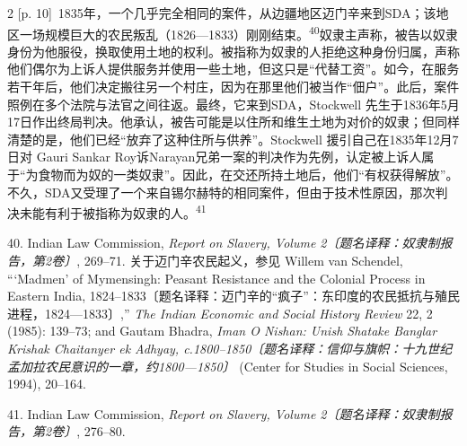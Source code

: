 \documentclass[10pt,a4paper]{article}
\begin{document}
\begin{paracol}{2}
{\scriptsize\color{gray} [p. 10]}\ 1835年，一个几乎完全相同的案件，从边疆地区迈门辛来到SDA；该地区一场规模巨大的农民叛乱（1826—1833）刚刚结\mbox{束。\textsuperscript{40}}奴隶主声称，被告以奴隶身份为他服役，换取使用土地的权利。被指称为奴隶的人拒绝这种身份归属，声称他们偶尔为上诉人提供服务并使用一些土地，但这只是“代替工资”。如今，在服务若干年后，他们决定搬往另一个村庄，因为在那里他们被当作“佃户”。此后，案件照例在多个法院与法官之间往返。最终，它来到SDA，Stockwell 先生于1836年5月17日作出终局判决。他承认，被告可能是以住所和维生土地为对价的奴隶；但同样清楚的是，他们已经“放弃了这种住所与供养”。Stockwell 援引自己在1835年12月7日对 Gauri Sankar Roy诉Narayan兄弟一案的判决作为先例，认定被上诉人属于“为食物而为奴的一类奴隶”。因此，在交还所持土地后，他们“有权获得解放”。不久，SDA又受理了一个来自锡尔赫特的相同案件，但由于技术性原因，那次判决未能有利于被指称为奴隶的\mbox{人。\textsuperscript{41}}\par{\small 40. Indian Law Commission, \textit{Report on Slavery, Volume 2〔题名译释：奴隶制报告，第2卷〕}, 269–71. 关于迈门辛农民起义，参见 Willem van Schendel, “‘Madmen’ of Mymensingh: Peasant Resistance and the Colonial Process in Eastern India, 1824–1833〔题名译释：迈门辛的“疯子”：东印度的农民抵抗与殖民进程，1824—1833〕,” \textit{The Indian Economic and Social History Review} 22, 2 (1985): 139–73; and Gautam Bhadra, \textit{Iman O Nishan: Unish Shatake Banglar Krishak Chaitanyer ek Adhyay, c.1800–1850〔题名译释：信仰与旗帜：十九世纪孟加拉农民意识的一章，约1800—1850〕} (Center for Studies in Social Sciences, 1994), 20–164.\par}{\small 41. Indian Law Commission, \textit{Report on Slavery, Volume 2〔题名译释：奴隶制报告，第2卷〕}, 276–80.\par}
\switchcolumn

\end{paracol}
\end{document}
